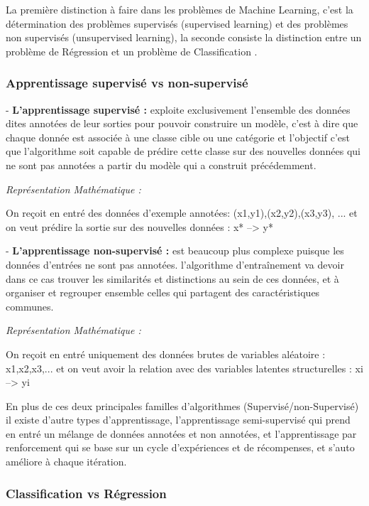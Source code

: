 La première distinction à faire dans les problèmes de Machine Learning, c'est la détermination des problèmes supervisés (supervised learning) et des problèmes non supervisés (unsupervised learning), la seconde consiste la distinction entre un problème de Régression et un problème de Classification \cite{ML}.

\subsubsection{Apprentissage supervisé vs non-supervisé}


- \textbf{L'apprentissage supervisé : }exploite exclusivement l'ensemble des données dites annotées de leur sorties pour pouvoir construire un modèle, c'est à dire que chaque donnée est associée à une classe cible ou une catégorie et l'objectif c'est que l'algorithme soit capable de prédire cette classe sur des nouvelles données qui ne sont pas annotées a partir du modèle qui a construit précédemment.

\textit{Représentation Mathématique :} 
    
    On reçoit en entré des données d'exemple annotées:
    (x1,y1),(x2,y2),(x3,y3), ... et on veut prédire la sortie sur des nouvelles données :  x* --> y* 
    

- \textbf{L'apprentissage non-supervisé : } est beaucoup plus complexe puisque les données d'entrées ne sont pas annotées. l'algorithme d'entraînement va devoir dans ce cas  trouver  les similarités et distinctions au sein de ces données, et à organiser et regrouper ensemble celles qui partagent des caractéristiques communes.

\textit{Représentation Mathématique : }
    
    On reçoit en entré uniquement des données brutes de variables aléatoire : x1,x2,x3,... et on veut avoir la relation avec des variables latentes structurelles :  xi --> yi 
    
En plus de ces deux principales familles d'algorithmes (Supervisé/non-Supervisé) il existe d'autre types d'apprentissage, l'apprentissage semi-supervisé qui prend en entré un mélange de données annotées et non annotées, et l'apprentissage par renforcement qui se base sur un cycle d'expériences et de récompenses, et s'auto améliore à chaque itération.

\subsubsection{Classification vs Régression }

